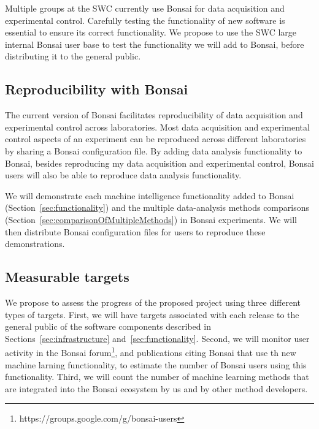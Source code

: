 Multiple groups at the SWC currently use Bonsai for data acquisition and
experimental control. Carefully testing the functionality of new software is
essential to ensure its correct functionality. We propose to use the SWC large
internal Bonsai user base to test the functionality we will add to Bonsai,
before distributing it to the general public.

\subsection{Reproducibility with Bonsai}
\label{sec:reproducibility}

The current version of Bonsai facilitates reproducibility of data acquisition
and experimental control across laboratories. Most data acquisition and
experimental control aspects of an experiment can be reproduced across
different laboratories by sharing a Bonsai configuration file.
%
By adding data analysis functionality to Bonsai, besides reproducing my data
acquisition and experimental control, Bonsai users will also be able to reproduce
data analysis functionality.

We will demonstrate each machine intelligence functionality added to Bonsai
(Section~\ref{sec:functionality}) and the multiple
data-analysis methods comparisons
(Section~\ref{sec:comparisonOfMultipleMethods}) in Bonsai experiments. We will
then distribute Bonsai configuration files for users to reproduce these
demonstrations.

\subsection{Measurable targets}
\label{sec:measurableTargets}

We propose to assess the progress of the proposed project using three different
types of targets.
%
First, we will have targets associated with each release to the general public
of the software components described in Sections~\ref{sec:infrastructure}
and~\ref{sec:functionality}.
%
Second, we will monitor user activity in the Bonsai
forum\footnote{https://groups.google.com/g/bonsai-users},
and publications citing Bonsai that use th new machine larning functionality,
to estimate the number of Bonsai users using this functionality.
%
Third, we will count the number of machine learning methods that are integrated
into the Bonsai ecosystem by us and by other method developers.

